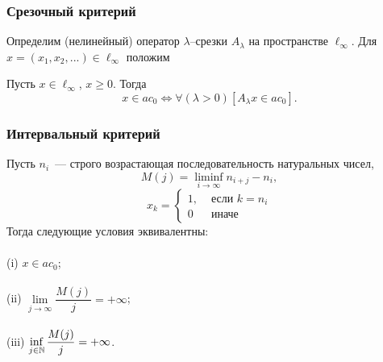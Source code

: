 \begin{frame}\frametitle{Срезочный критерий}
	Определим (нелинейный) оператор $\lambda$--срезки $A_\lambda$ на пространстве $\ell_\infty$.
	Для $x = (x_1, x_2, ...) \in \ell_\infty$ положим

		Пусть $x\in\ell_\infty$, $x\geq 0$.
		Тогда
		\begin{equation}
			x\in ac_0 \Leftrightarrow
			\forall(\lambda>0)[A_\lambda x \in ac_0]
			.
		\end{equation}
\end{frame}




\begin{frame}\frametitle{Интервальный критерий}
		\label{thm:M_j_ac0_inf_lim}
		Пусть $n_i$~--- строго возрастающая последовательность натуральных чисел,
		\begin{equation}
			\label{eq:definition_M_j}
			M(j) = \liminf_{i\to\infty} n_{i+j} - n_i,
		\end{equation}
		\begin{equation}
			x_k = \left\{\begin{array}{ll}
				1, & \mbox{~если~} k = n_i
				\\
				0  & \mbox{~иначе~}
			\end{array}\right.
		\end{equation}
		Тогда следующие условия эквивалентны:
		\\~\\
		(i)   $x \in ac_0$;
		\\~\\
		(ii)  $\lim\limits_{j \to \infty} \dfrac{M(j)}{j} = +\infty$;
		\\~\\
		(iii) $\inf\limits_{j \in \mathbb{N}}     \dfrac{M(j)}{j} = +\infty$.
\end{frame}


